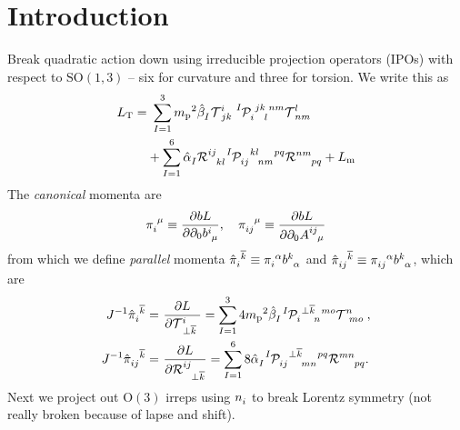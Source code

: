 \documentclass[aps,prd,reprint,preprintnumbers,superscriptaddress,showpacs,floatfix]{revtex4-2}
\begin{document}
\section{Introduction}
Break quadratic action down using irreducible projection operators (IPOs) with respect to $\mathrm{SO}(1,3)$ -- six for curvature and three for torsion. We write this as
\begin{equation}
\begin{aligned}
  L_{\text{T}}=&\ \sum_{I=1}^{3}{m_\text{p}}^2\tensor{\hat{\beta}}{_I}\tensor{\mathcal{  T}}{^{i}_{jk}}\tensor[^I]{\mathcal{  P}}{_{i}^{jk}_{l}^{nm}}\tensor{\mathcal{  T}}{^{l}_{nm}}\\
  &+\sum_{I=1}^{6}\tensor{\hat{\alpha}}{_I}\tensor{\mathcal{  R}}{^{ij}_{kl}}\tensor[^I]{\mathcal{  P}}{_{ij}^{kl}_{nm}^{pq}}\tensor{\mathcal{  R}}{^{nm}_{pq}}+L_{\text{m}}
  \label{<+label+>}
\end{aligned}
\end{equation}
The \emph{canonical} momenta are 
\begin{equation}
  \tensor{\pi}{_i^\mu}\equiv\frac{\partial bL}{\partial\partial_0\tensor{b}{^i_{\mu}}}, \quad \tensor{\pi}{_{ij}^{\mu}}\equiv\frac{\partial bL}{\partial\partial_0\tensor{A}{^{ij}_{\mu}}}
  \label{<+label+>}
\end{equation}
from which we define \emph{parallel} momenta $\tensor{\hat{\pi}}{_{i}^{\overline{k}}}\equiv\tensor{\pi}{_{i}^\alpha}\tensor{b}{^{k}_\alpha}$ and $\tensor{\hat{\pi}}{_{ij}^{\overline{k}}}\equiv\tensor{\pi}{_{ij}^\alpha}\tensor{b}{^{k}_\alpha}$, which are
\begin{subequations}
  \begin{align}
    J^{-1}\tensor{\hat{\pi}}{_{i}^{\overline{k}}}=&\ \frac{\partial L}{\partial \tensor{\mathcal{  T}}{^i_{\perp\overline{k}}}}=\sum_{I=1}^{3}4{m_\text{p}}^2\tensor{\hat{\beta}}{_{I}}\tensor[^I]{\mathcal{  P}}{_i^{\perp\overline{k}}_n^{mo}}\tensor{\mathcal{  T}}{^n_{mo}},\\
    J^{-1}\tensor{\hat{\pi}}{_{ij}^{\overline{k}}}=&\ \frac{\partial L}{\partial \tensor{\mathcal{  R}}{^{ij}_{\perp\overline{k}}}}=\sum_{I=1}^{6}8\tensor{\hat{\alpha}}{_{I}}\tensor[^I]{\mathcal{  P}}{_{ij}^{\perp\overline{k}}_{mn}^{pq}}\tensor{\mathcal{  R}}{^{mn}_{pq}}.
    \label{<+label+>}
  \end{align}
  \label{<+label+>}
\end{subequations}
Next we project out $\mathrm{O}(3)$ irreps using $\tensor{n}{_i}$ to break Lorentz symmetry (not really broken because of lapse and shift). 
\end{document}
